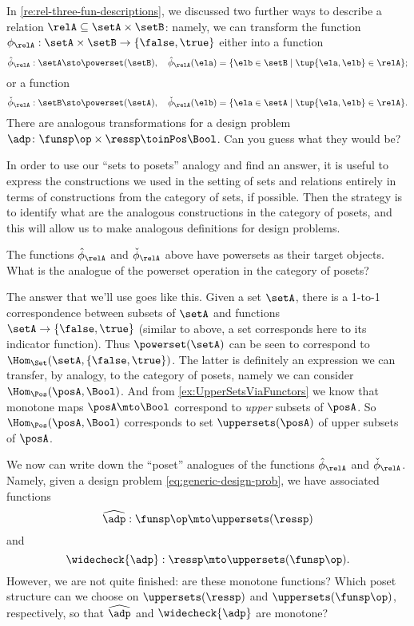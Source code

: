 In \cref{re:rel-three-fun-descriptions}, we discussed two further ways to describe a relation $\relA \subseteq \setA \times \setB$: namely, we can transform the function $\phi_{\relA}: \setA \times \setB \to \{ \false, \true \}$ either into a function 
\begin{equation}\label{eq:curried-relation-again}
\hat \phi_{\relA} : \setA \sto \powerset (\setB), \quad \hat \phi_{\relA} (\ela) = \{ \elb \in \setB \mid \tup{\ela, \elb} \in \relA \};
\end{equation}
or a function 
\begin{equation}\label{eq:co-curried-relation-again}
\check \phi_{\relA} : \setB \sto \powerset (\setA), \quad \check \phi_{\relA} (\elb) = \{ \ela \in \setA \mid \tup{\ela, \elb} \in \relA \}. 
\end{equation}
There are analogous transformations for a design problem $\adp\colon \funsp\op \times \ressp\toinPos \Bool$. Can you guess what they would be?

In order to use our ``sets to posets'' analogy and find an answer, it is useful to express the constructions we used in the setting of sets and relations entirely in terms of constructions from the category of sets, if possible. Then the strategy is to identify what are the analogous constructions in the category of posets, and this will allow us to make analogous definitions for design problems. 

The functions $\hat \phi_{\relA}$ and $\check \phi_{\relA}$ above have powersets as their target objects. What is the analogue of the powerset operation in the category of posets? 

The answer that we'll use goes like this. Given a set $\setA$, there is a 1-to-1 correspondence between subsets of $\setA$ and functions $\setA \to \{ \false, \true \}$ (similar to above, a set corresponds here to its indicator function). Thus $\powerset (\setA)$ can be seen to correspond to $\Hom_{\Set}(\setA, \{ \false, \true\})$. The latter is definitely an expression we can transfer, by analogy, to the category of posets, namely we can consider $\Hom_{\Pos}(\posA, \Bool)$. And from \cref{ex:UpperSetsViaFunctors} we know that monotone maps $\posA \mto \Bool$ correspond to \emph{upper} subsets of $\posA$. So $\Hom_{\Pos}(\posA, \Bool)$ corresponds to set $\uppersets (\posA)$ of upper subsets of $\posA$. 

We now can write down the ``poset'' analogues of the functions $\hat \phi_{\relA}$ and $\check \phi_{\relA}$. Namely, given a design problem \cref{eq:generic-design-prob}, we have associated functions 
\begin{equation}\label{eq:dp-left-curry}
\widehat{\adp} : \funsp\op \mto \uppersets (\ressp)
\end{equation}
and 
\begin{equation}\label{eq:dp-right-curry}
\widecheck{\adp} : \ressp \mto \uppersets (\funsp\op).
\end{equation}
However, we are not quite finished: are these monotone functions? Which poset structure can we choose on $\uppersets (\ressp)$ and $\uppersets (\funsp\op)$, respectively, so that $\widehat{\adp}$ and $\widecheck{\adp}$ are monotone?

